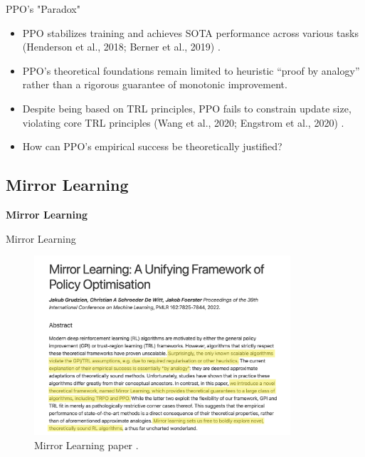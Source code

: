 \documentclass[9pt]{beamer}
\begin{document}
\begin{frame}{PPO's "Paradox"}
  \begin{itemize}
    \item PPO stabilizes training and achieves SOTA performance across various tasks (Henderson et al., 2018; Berner et al., 2019) \cite{berner2019dota}.
    
    \vspace{1em}  %
\pause

    \item PPO’s theoretical foundations remain limited to heuristic “proof by analogy” rather than a rigorous guarantee of monotonic improvement.
    
    \vspace{1em}  %
    
\pause
    \item Despite being based on TRL principles, PPO fails to constrain update size, violating core TRL principles (Wang et al., 2020; Engstrom et al., 2020) \cite{wang2020truly}.
    
\pause
    \vspace{1em}  %

   \item How can PPO’s empirical success be theoretically justified?
  \end{itemize}
\end{frame}

\begin{frame}[plain]
  \section{Mirror Learning}
  \vfill
  \begin{center}
    \Huge \textbf{Mirror Learning}
  \end{center}
  \vfill
\end{frame}


\begin{frame}{Mirror Learning}
  \begin{figure}
    \centering
    \includegraphics[width=0.85\textwidth]{figures/mirror_learning.png}
    \caption{Mirror Learning paper \cite{mirror2022}.}
    \label{fig:trl1}
  \end{figure}
\end{frame}
\end{document}
